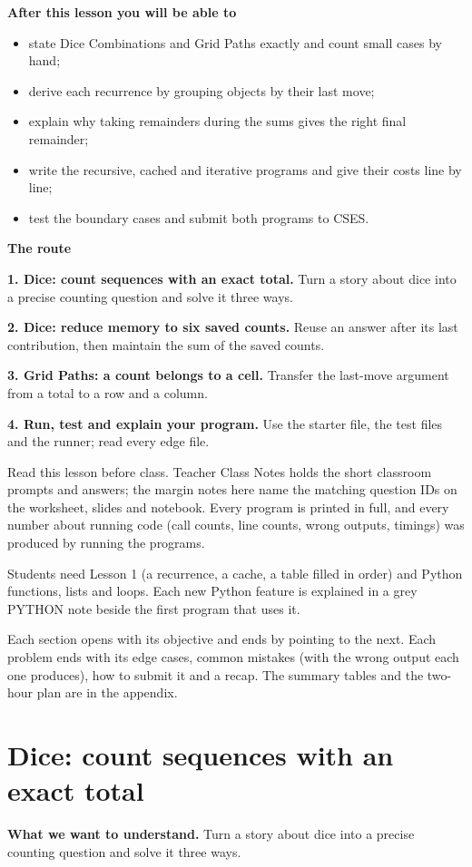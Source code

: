 \documentclass[11pt,a4paper,oneside]{report}
\newcommand{\readinggoal}[1]{\par\textbf{What we want to understand.} #1\par\smallskip}
\begin{document}
\textbf{After this lesson you will be able to}\begin{itemize}\item state Dice Combinations and Grid Paths exactly and count small cases by hand;\item derive each recurrence by grouping objects by their last move;\item explain why taking remainders during the sums gives the right final remainder;\item write the recursive, cached and iterative programs and give their costs line by line;\item test the boundary cases and submit both programs to CSES.\end{itemize}
\textbf{The route}\par
\textbf{1. Dice: count sequences with an exact total.} Turn a story about dice into a precise counting question and solve it three ways.\par
\textbf{2. Dice: reduce memory to six saved counts.} Reuse an answer after its last contribution, then maintain the sum of the saved counts.\par
\textbf{3. Grid Paths: a count belongs to a cell.} Transfer the last-move argument from a total to a row and a column.\par
\textbf{4. Run, test and explain your program.} Use the starter file, the test files and the runner; read every edge file.\par
Read this lesson before class. Teacher Class Notes holds the short classroom prompts and answers; the margin notes here name the matching question IDs on the worksheet, slides and notebook. Every program is printed in full, and every number about running code (call counts, line counts, wrong outputs, timings) was produced by running the programs.

Students need Lesson 1 (a recurrence, a cache, a table filled in order) and Python functions, lists and loops. Each new Python feature is explained in a grey PYTHON note beside the first program that uses it.

Each section opens with its objective and ends by pointing to the next. Each problem ends with its edge cases, common mistakes (with the wrong output each one produces), how to submit it and a recap. The summary tables and the two-hour plan are in the appendix.


\chapter{Dice: count sequences with an exact total}
\readinggoal{Turn a story about dice into a precise counting question and solve it three ways.}
\end{document}

